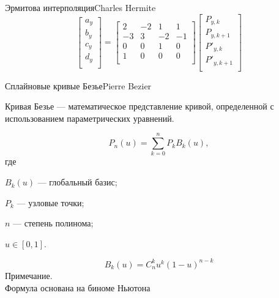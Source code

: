 \documentclass{beamer}
\begin{document}
\begin{frame}{Эрмитова интерполяция}{Charles Hermite}
{		\[
			\begin{bmatrix}
				a_y \\
				b_y \\
				c_y \\
				d_y \\
			\end{bmatrix}
			=
			\begin{bmatrix}
				2 & -2 & 1 & 1 \\
				-3 & 3 & -2 & -1 \\
				0 & 0 & 1 & 0 \\
				1 & 0 & 0 & 0 \\
			\end{bmatrix}
			\begin{bmatrix}
				P_{y,k} \\
				P_{y,k+1} \\
				P'_{y,k} \\
				P'_{y,k+1} \\
			\end{bmatrix}
		\]
		}

	\end{frame}

	\begin{frame}{Сплайновые кривые Безье}{Pierre Bezier}

		Кривая Безье --- математическое представление кривой, определенной с использованием параметрических уравнений.

		\[
			P_n(u) = \sum_{k = 0}^{n}	P_k B_k(u)
			,
		\]
		где 
		
		$B_k (u)$ --- глобальный базис;

		$P_k$ --- узловые точки;

		
		$n$ --- степень полинома;

		$u \in [0,1]$.

		\[
			B_k (u) = C_n^k u^k (1 - u)^{n-k}	
		\]
		Примечание. \\ Формула основана на биноме Ньютона


	\end{frame}
\end{document}
